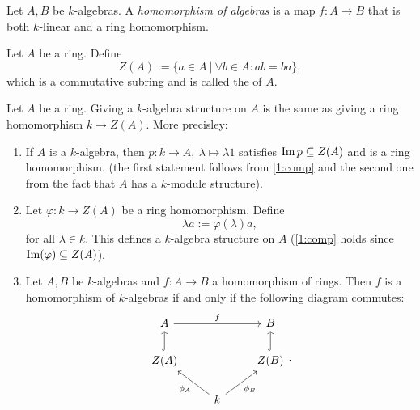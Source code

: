 \begin{defn}
	Let $A,B$ be $k$-algebras. A \emph{homomorphism of algebras} is a map $f:A\to B$ that is both $k$-linear and a ring homomorphism.
\end{defn}
\begin{rem}
	Let $A$ be a ring. Define
	\[
		Z(A):= \{a\in A~|~\forall b\in A: ab=ba\},
	\]
	which is a commutative subring and is called the  of $A$.
\end{rem}
\begin{rem}\label{1:eqalgcent}
	Let $A$ be a ring. Giving a $k$-algebra structure on $A$ is the same as giving a ring homomorphism $k\to Z(A)$. More precisley:
	\begin{enumerate}
		\item If $A$ is a $k$-algebra, then $p:k\to A,~\lambda\mapsto \lambda 1$ satisfies $\operatorname{Im} p\subseteq Z(A)$ and is a ring homomorphism. (the first statement follows from \eqref{1:comp} and the second one from the fact that $A$ has a $k$-module structure).
		 \item Let $\varphi:k\to Z(A)$ be a ring homomorphism. Define
		 \[
		 \lambda a:= \varphi(\lambda)a,
			\]
		for all $\lambda \in k$. This defines a $k$-algebra structure on $A$ (\eqref{1:comp} holds since $\operatorname{Im}(\varphi)\subseteq Z(A)$).
		\item Let $A,B$ be $k$-algebras and $f:A\to B$ a homomorphism of rings. Then $f$ is a homomorphism of $k$-algebras if and only if the following diagram commutes:
		\[
		\begin{tikzcd}
			A\ar{rr}{f}&&B\\
			Z(A)\ar[hookrightarrow]{u}&&\ar[hookrightarrow]{u}Z(B)\\
			&k\ar{ul}{\phi_A}\ar[swap]{ur}{\phi_B}&
		\end{tikzcd}.
		\]
	\end{enumerate}
\end{rem}
